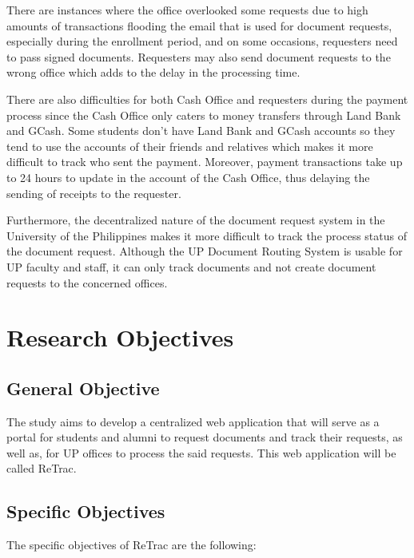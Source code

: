 There are instances where the office overlooked some requests due to high amounts of transactions flooding the email that is used for document requests, especially during the enrollment period, and on some occasions, requesters need to pass signed documents. Requesters may also send document requests to the wrong office which adds to the delay in the processing time.

There are also difficulties for both Cash Office and requesters during the payment process since the Cash Office only caters to money transfers through Land Bank and GCash. Some students don't have Land Bank and GCash accounts so they tend to use the accounts of their friends and relatives which makes it more difficult to track who sent the payment. Moreover, payment transactions take up to 24 hours to update in the account of the Cash Office, thus delaying the sending of receipts to the requester.

Furthermore, the decentralized nature of the document request system in the University of the Philippines makes it more difficult to track the process status of the document request. Although the UP Document Routing System is usable for UP faculty and staff, it can only track documents and not create document requests to the concerned offices.


\section{Research Objectives}
\label{sec:researchobjectives}

\subsection{General Objective}
\label{sec:generalobjective}

The study aims to develop a centralized web application that will serve as a portal for students and alumni to request documents and track their requests, as well as, for UP offices to process the said requests. This web application will be called ReTrac.


\subsection{Specific Objectives}
\label{sec:specificobjectives}


The specific objectives of ReTrac are the following:

